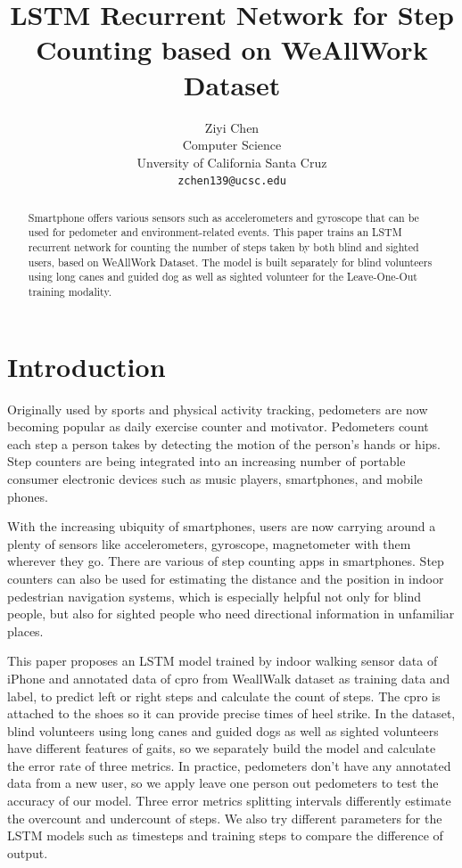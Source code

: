 \documentclass[11pt]{article}
\title{LSTM Recurrent Network for Step Counting based on WeAllWork Dataset}
\author{Ziyi Chen \\
  Computer Science  \\
  Unversity of California Santa Cruz\\
  {\tt zchen139@ucsc.edu}}
\date{}
\begin{document}
\maketitle
\begin{abstract}

Smartphone offers various sensors such as accelerometers and gyroscope that can be used for pedometer and environment-related events. This paper trains an LSTM recurrent network for counting the number of steps taken by both blind and sighted users, based on WeAllWork Dataset. The model is built separately for blind volunteers using long canes and guided dog as well as sighted volunteer for the Leave-One-Out training modality.

\end{abstract}

\section{Introduction}

Originally used by sports and physical activity tracking, pedometers are now becoming popular as daily exercise counter and motivator. Pedometers count each step a person takes by detecting the motion of the person's hands or hips. Step counters are being integrated into an increasing number of portable consumer electronic devices such as music players, smartphones, and mobile phones. 

With the increasing ubiquity of smartphones, users are now carrying around a plenty of sensors like accelerometers, gyroscope, magnetometer with them wherever they go. There are various of step counting apps in smartphones. Step counters can also be used for estimating the distance and the position in indoor pedestrian navigation systems, which is especially helpful not only for blind people, but also for sighted people who need directional information in unfamiliar places.

This paper proposes an LSTM model trained by indoor walking sensor data of iPhone and annotated data of cpro from WeallWalk dataset as training data and label, to predict left or right steps and calculate the count of steps. The cpro is attached to the shoes so it can provide precise times of heel strike. In the dataset, blind volunteers using long canes and guided dogs as well as sighted volunteers have different features of gaits, so we separately build the model and calculate the error rate of three metrics. In practice, pedometers don't have any annotated data from a new user, so we apply leave one person out pedometers to test the accuracy of our model. Three error metrics splitting intervals differently estimate the overcount and undercount of steps. We also try different parameters for the LSTM models such as timesteps and training steps to compare the difference of output.
\end{document}
